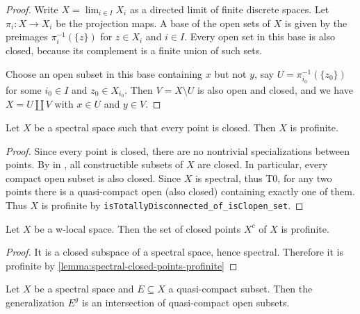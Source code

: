 \begin{proof}
  Write $X = \lim_{i \in I} X_i$ as a directed limit of finite discrete spaces. Let $\pi_i \colon X \to X_i$ be the
  projection maps. A base of the open sets of $X$ is given by the preimages $\pi_i^{-1}(\{z\})$ for $z \in X_i$ and $i \in I$. Every open set in this base is also closed, because its complement is a finite union of such sets.

  Choose an open subset in this base containing $x$ but not $y$, say $U = \pi_{i_0}^{-1}(\{z_0\})$ for some $i_0 \in I$ and $z_0 \in X_{i_0}$. Then $V = X \setminus U$ is also open and closed, and we have $X = U \coprod V$ with $x \in U$ and $y \in V$.   
\end{proof}

\begin{lemma}
  Let $X$ be a spectral space such that every point is closed. Then $X$ is profinite.
  \label{lemma:spectral-closed-points-profinite}
\end{lemma}

\begin{proof}
  Since every point is closed, there are no nontrivial specializations between points. By  in , all constructible subsets of $X$ are closed. In particular, every compact open subset is also closed. Since $X$ is spectral, thus T0, for any two points there is a quasi-compact open (also closed) containing exactly one of them. Thus $X$ is profinite by \verb`isTotallyDisconnected_of_isClopen_set`.
\end{proof}

\begin{lemma}
    Let $X$ be a w-local space. Then the set of closed points $X^c$ of $X$ is profinite.
    \label{lemma:w-local-closed-points-profinite}
\end{lemma}

\begin{proof}
    It is a closed subspace of a spectral space, hence spectral. Therefore it is profinite by
    \ref{lemma:spectral-closed-points-profinite}
\end{proof}

\begin{lemma}
  Let $X$ be a spectral space and $E \subseteq X$ a quasi-compact subset. Then the generalization $E^g$ is an intersection of quasi-compact open subsets.
  \label{lemma:spectral-generalization-intersection-open}
\end{lemma}

